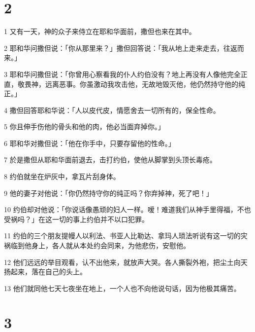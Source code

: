 \chapter{2}

\par 1 又有一天，神的众子来侍立在耶和华面前，撒但也来在其中。
\par 2 耶和华问撒但说：「你从那里来？」撒但回答说：「我从地上走来走去，往返而来。」
\par 3 耶和华问撒但说：「你曾用心察看我的仆人约伯没有？地上再没有人像他完全正直，敬畏神，远离恶事。你虽激动我攻击他，无故地毁灭他，他仍然持守他的纯正。」
\par 4 撒但回答耶和华说：「人以皮代皮，情愿舍去一切所有的，保全性命。
\par 5 你且伸手伤他的骨头和他的肉，他必当面弃掉你。」
\par 6 耶和华对撒但说：「他在你手中，只要存留他的性命。」
\par 7 於是撒但从耶和华面前退去，击打约伯，使他从脚掌到头顶长毒疮。
\par 8 约伯就坐在炉灰中，拿瓦片刮身体。
\par 9 他的妻子对他说：「你仍然持守你的纯正吗？你弃掉神，死了吧！」
\par 10 约伯却对他说：「你说话像愚顽的妇人一样。嗳！难道我们从神手里得福，不也受祸吗？」在这一切的事上约伯并不以口犯罪。
\par 11 约伯的三个朋友提幔人以利法、书亚人比勒达、拿玛人琐法听说有这一切的灾祸临到他身上，各人就从本处约会同来，为他悲伤，安慰他。
\par 12 他们远远的举目观看，认不出他来，就放声大哭。各人撕裂外袍，把尘土向天扬起来，落在自己的头上。
\par 13 他们就同他七天七夜坐在地上，一个人也不向他说句话，因为他极其痛苦。

\chapter{3}

